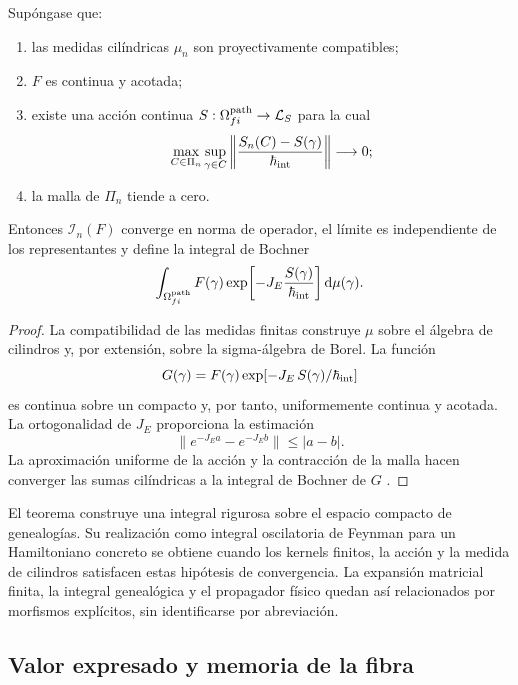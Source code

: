 \begin{theorem}
\label{thm:integral-genealogica-caminos-rev2}
Supóngase que:
\begin{enumerate}
 \item las medidas cilíndricas \(\mu_n\) son proyectivamente compatibles;
 \item \(F\) es continua y acotada;
 \item existe una acción continua
 \(S:\Omega^{\rm path}_{fi}\to\mathcal L_S\) para la cual
 \[
  \max_{C\in\Pi_n}\sup_{\gamma\in C}
  \left\|\frac{S_n(C)-S(\gamma)}{\hbar_{\rm int}}\right\|
  \longrightarrow0;
 \]
 \item la malla de \(\Pi_n\) tiende a cero.
\end{enumerate}
Entonces \(\mathcal I_n(F)\) converge en norma de operador, el límite es
independiente de los representantes y define la integral de Bochner
\begin{equation}
 \int_{\Omega^{\rm path}_{fi}}
 F(\gamma)
 \exp\!\left[-J_E\frac{S(\gamma)}{\hbar_{\rm int}}\right]
 \mathrm d\mu(\gamma).
 \label{eq:integral-genealogica-caminos-rev2}
\end{equation}
\end{theorem}

\begin{proof}
La compatibilidad de las medidas finitas construye \(\mu\) sobre el álgebra
de cilindros y, por extensión, sobre la sigma-álgebra de Borel. La función
\[
 G(\gamma)=F(\gamma)
 \exp[-J_E\,S(\gamma)/\hbar_{\rm int}]
\]
es continua sobre un compacto y, por tanto, uniformemente continua y
acotada. La ortogonalidad de \(J_E\) proporciona la estimación
\[
 \|e^{-J_E a}-e^{-J_E b}\|\leq |a-b|.
\]
La aproximación uniforme de la acción y la contracción de la malla hacen
converger las sumas cilíndricas a la integral de Bochner de \(G\)
\cite{Bochner1955}.
\end{proof}

El teorema construye una integral rigurosa sobre el espacio compacto de
genealogías. Su realización como integral oscilatoria de Feynman para un
Hamiltoniano concreto se obtiene cuando los kernels finitos, la acción y la
medida de cilindros satisfacen estas hipótesis de convergencia. La expansión
matricial finita, la integral genealógica y el propagador físico quedan así
relacionados por morfismos explícitos, sin identificarse por abreviación.

\subsection{Valor expresado y memoria de la fibra}

